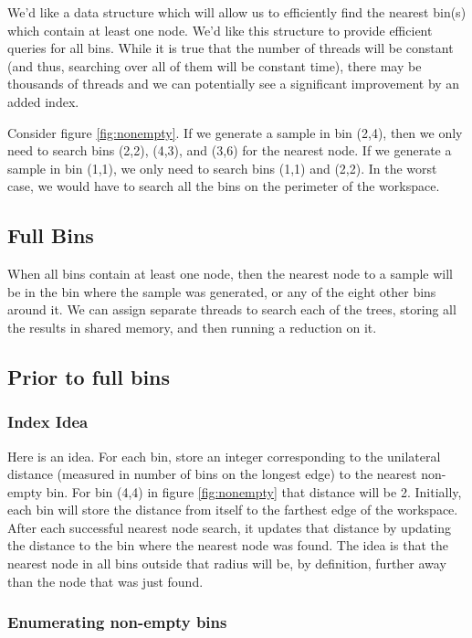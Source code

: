 We'd like a data structure which will allow us to efficiently find the nearest bin(s) which contain at least one node. We'd like this structure to provide efficient queries for all bins. While it is true that the number of threads will be constant (and thus, searching over all of them will be constant time), there may be thousands of threads and we can potentially see a significant improvement by an added index. 

Consider figure \ref{fig:nonempty}. If we generate a sample in bin (2,4), then we only need to search bins (2,2), (4,3), and (3,6) for the nearest node. If we generate a sample in bin (1,1), we only need to search bins (1,1) and (2,2). In the worst case, we would have to search all the bins on the perimeter of the workspace. 

\subsection{Full Bins}

When all bins contain at least one node, then the nearest node to a sample will be in the bin where the sample was generated, or any of the eight other bins around it. We can assign separate threads to search each of the trees, storing all the results in shared memory, and then running a reduction on it. 

\subsection{Prior to full bins}

\subsubsection{Index Idea}

Here is an idea. For each bin, store an integer corresponding to the unilateral distance (measured in number of bins on the longest edge) to the nearest non-empty bin. For bin (4,4) in figure \ref{fig:nonempty} that distance will be 2. Initially, each bin will store the distance from itself to the farthest edge of the workspace. After each successful nearest node search, it updates that distance by updating the distance to the bin where the nearest node was found. The idea is that the nearest node in all bins outside that radius will be, by definition, further away than the node that was just found. 

\subsubsection{Enumerating non-empty bins}

